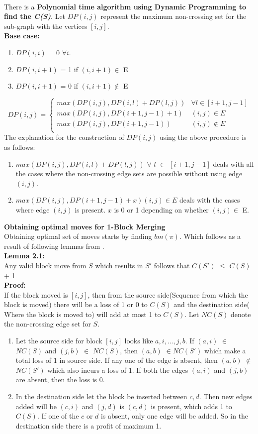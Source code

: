 \documentclass[BTech]{iitmdiss}
\begin{document}
\\
\noindent
There is a \textbf{Polynomial time algorithm using Dynamic Programming to find the \textit{C(S)}}. Let $DP(i,j)$ represent the maximum non-crossing set for the sub-graph with the vertices $[i,j]$. \\
\textbf{Base case:}
\begin{enumerate}
    \item $DP(i,i)$ = 0 $\forall i$.
    \item $DP(i,i+1)$ = 1 if $(i,i+1) \in$ E
    \item $DP(i,i+1)$ = 0 if $(i,i+1) \notin$ E
\end{enumerate}
\[ DP(i,j) = \begin{cases} 
      max(DP(i,j),DP(i,l) + DP(l,j)) & \forall l \in [i+1,j-1] \\
      max(DP(i,j),DP(i+1,j-1) + 1) & (i,j) \in E \\
      max(DP(i,j),DP(i+1,j-1)) & (i,j) \notin E \\
   \end{cases}
\]
The explanation for the construction of $DP(i,j)$ using the above procedure is as follows:
\begin{enumerate}
    \item $max(DP(i,j),DP(i,l) + DP(l,j))$  $\forall$ $l$ $\in$ $[i+1,j-1]$ deals with all the cases where the non-crossing edge sets are possible without using edge $(i,j)$.
    \item $max(DP(i,j),DP(i+1,j-1) + x) (i,j) \in E$ deals with the cases where edge $(i,j)$ is present. $x$ is 0 or 1 depending on whether $(i,j) \in$ E. 
\end{enumerate}
\noindent
\textbf{Obtaining optimal moves for 1-Block Merging}\\
Obtaining optimal set of moves starts by finding $bm(\pi)$. Which follows as a result of following lemmas from \citep{mahajan2006approximate}.\\
\textbf{Lemma 2.1:}\\
Any valid block move from $S$ which results in $S'$ follows that $C(S')$ $\leq$ $C(S)$ + 1\\
\textbf{Proof:}\\
If the block moved is $[i,j]$, then from the source side(Sequence from which the block is moved) there will be a loss of 1 or 0 to $C(S)$ and the destination side( Where the block is moved to) will add at most 1 to $C(S)$. Let $NC(S)$ denote the non-crossing edge set for $S$.
\begin{enumerate}
    \item Let the source side for block $[i,j]$ looks like $a,i,...,j,b.$ If $(a,i)$ $\in$ $NC(S)$ and $(j,b)$ $\in$ $NC(S)$, then $(a,b)$ $\in NC(S')$ which make a total loss of 1 in source side. If any one of the edge is absent, then $(a,b)$ $\notin$ $NC(S')$ which also incurs a loss of 1. If both the edges $(a,i)$ and $(j,b)$ are absent, then the loss is 0.
    \item In the destination side let the block be inserted between $c,d$. Then new edges added will be $(c,i)$ and $(j,d)$ is $(c,d)$ is present, which adds 1 to $C(S)$. If one of the $c$ or $d$ is absent, only one edge will be added. So in the destination side there is a profit of maximum 1.
\end{enumerate}
\end{document}
